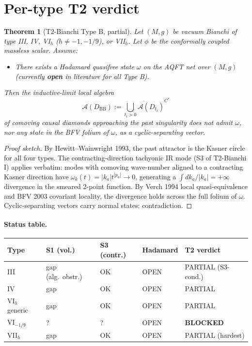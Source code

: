 \documentclass[11pt,a4paper]{article}
\newtheorem{theorem}{Theorem}
\begin{document}
\section{Per-type T2 verdict}

\begin{theorem}[T2-Bianchi Type B, partial]
Let $(M,g)$ be vacuum Bianchi of type III, IV, VI$_h$ ($h \neq -1, -1/9$),
or VII$_h$. Let $\phi$ be the conformally coupled massless scalar. Assume:
\begin{itemize}
\item[(H)] There exists a Hadamard quasifree state $\omega$ on the AQFT
net over $(M,g)$ (currently \textbf{open} in literature for all Type B).
\end{itemize}
Then the inductive-limit local algebra
\[
\mathcal{A}(D_{\mathrm{BB}}) := \overline{\bigcup_{t_i > 0}
\mathcal{A}(D_{t_i})}^{C^*}
\]
of comoving causal diamonds approaching the past singularity does
\emph{not} admit $\omega$, nor any state in the BFV folium of $\omega$,
as a cyclic-separating vector.
\end{theorem}

\begin{proof}[Proof sketch]
By Hewitt--Wainwright 1993, the past attractor is the Kasner circle for
all four types. The contracting-direction tachyonic IR mode (S3 of
T2-Bianchi I) applies verbatim: modes with comoving wave-number aligned
to a contracting Kasner direction have $\omega_k(t) = |k_a| t^{|p_a|} \to 0$,
generating a $\int dk_a / |k_a| = +\infty$ divergence in the smeared
2-point function. By Verch 1994 local quasi-equivalence and BFV 2003
covariant locality, the divergence holds across the full folium of
$\omega$. Cyclic-separating vectors carry normal states; contradiction.
\end{proof}

\paragraph{Status table.}
\begin{center}
\begin{tabular}{lllll}
\hline
Type & S1 (vol.) & S3 (contr.) & Hadamard & T2 verdict \\
\hline
III & gap (alg.\ obstr.) & OK & OPEN & PARTIAL (S3-cond.) \\
IV & gap & OK & OPEN & PARTIAL \\
VI$_h$ generic & gap & OK & OPEN & PARTIAL \\
VI$_{-1/9}$ & ? & ? & OPEN & \textbf{BLOCKED} \\
VII$_h$ & gap & OK & OPEN & PARTIAL (hardest) \\
\hline
\end{tabular}
\end{center}
\end{document}
